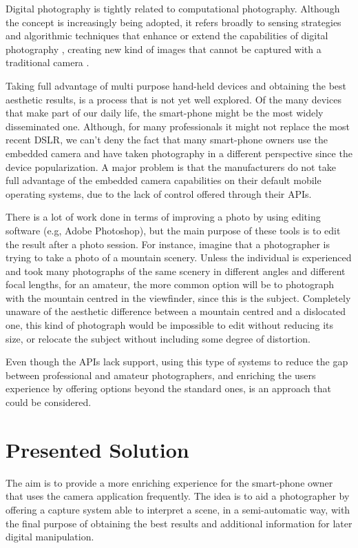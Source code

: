 Digital photography is tightly related to computational photography. Although the concept is increasingly being adopted, it refers broadly to sensing strategies and algorithmic techniques that enhance or extend the capabilities of digital photography \cite{Szeliski2012} , creating new kind of images that cannot be captured with a traditional camera \cite{Pulli}. 

Taking full advantage of multi purpose hand-held devices and obtaining the best aesthetic results, is a process that is not yet well explored. 
Of the many devices that make part of our daily life, the smart-phone might be the most widely disseminated one. Although, for many professionals it might not replace the most recent DSLR, we can't deny the fact that many smart-phone owners use the embedded camera and have taken photography in a different perspective since the device popularization. A major problem is that the manufacturers do not take full advantage of the embedded camera capabilities on their default mobile operating systems, due to the lack of control offered through their APIs.

There is a lot of work done in terms of improving a photo by using editing software (e.g, Adobe Photoshop), but the main purpose of these tools is to edit the result after a photo session. For instance, imagine that a photographer is trying to take a photo of a mountain scenery. Unless the individual is experienced and took many photographs of the same scenery in different angles and different focal lengths, for an amateur, the more common option will be to photograph with the mountain centred in the viewfinder, since this is the subject. Completely unaware of the aesthetic difference between a mountain centred and a dislocated one, this kind of photograph would be impossible to edit without reducing its size, or relocate the subject without including some degree of distortion.

Even though the APIs lack  support, using this type of systems to reduce the gap between professional and amateur photographers, and enriching the users experience by offering options beyond the standard ones, is an approach that could be considered.

\section{Presented Solution}

The aim is to provide a more enriching experience for the smart-phone owner that uses the camera application frequently. The idea is to aid a photographer by offering a capture system able to interpret a scene, in a semi-automatic way, with the final purpose of obtaining the best results and additional information for later digital manipulation.

